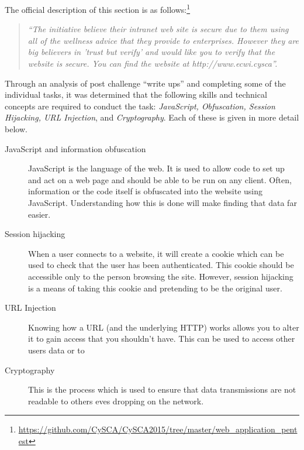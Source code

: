\documentclass[a4paper,11pt]{report}
\begin{document}
			The official description of this section is as follows:\footnote{\url{https://github.com/CySCA/CySCA2015/tree/master/web\_application\_pentest}}
			\begin{quote}
				\textit{
				``The initiative believe their intranet web site is secure due to them using all of the wellness advice that they provide to enterprises. However they are big believers in 'trust but verify' and would like you to verify that the website is secure. You can find the website at http://www.ecwi.cysca''. }
			\end{quote}

			Through an analysis of post challenge ``write ups'' and completing some of the individual tasks, 
			it was determined that the following skills and technical concepts are required to conduct the task: 
			\textit{JavaScript, Obfuscation, Session Hijacking, URL Injection}, and \textit{Cryptography}. 
			Each of these is given in more detail below. 
			\begin{description}
				\item[JavaScript and information obfuscation]
					JavaScript is the language of the web. It is used to allow code to set up and act on a web page and should be able to be run on any client. 
					Often, information or the code itself is obfuscated into the website using JavaScript.
					Understanding how this is done will make finding that data far easier. 
				\item[Session hijacking]
					When a user connects to a website, it will create a cookie which can be used to check that the user has been authenticated. 
					This cookie should be accessible only to the person browsing the site. 
					However, session hijacking is a means of taking this cookie and pretending to be the original user. 
				\item[URL Injection]
					Knowing how a URL (and the underlying HTTP) works allows you to alter it to gain access that you shouldn't have. 
					This can be used to access other users data or to 
				\item[Cryptography]
					This is the process which is used to ensure that data transmissions are not readable to others eves dropping on the network. 
			\end{description}
\end{document}
